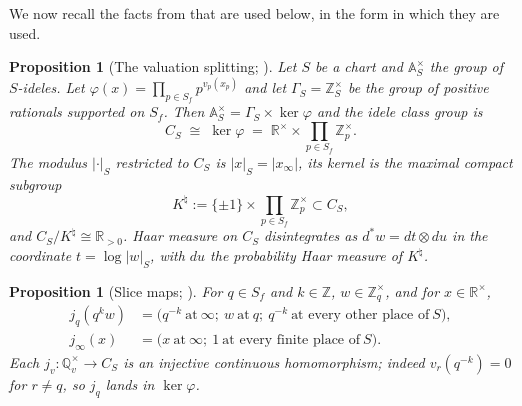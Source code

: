 \documentclass[11pt]{amsart}
\newtheorem{proposition}[theorem]{Proposition}
\theoremstyle{definition}
\theoremstyle{remark}
\newcommand{\R}{\mathbb R}
\newcommand{\Z}{\mathbb Z}
\newcommand{\Q}{\mathbb Q}
\newcommand{\A}{\mathbb A}
\newcommand{\Knat}{K^{\natural}}
\begin{document}
We now recall the facts from \cite{Companion} that are used below, in the
form in which they are used.

\begin{proposition}[The valuation splitting; {\cite[Lemma 2.2]{Companion}}]
\label{prop:splitting}
Let $S$ be a chart and $\A_S^\times$ the group of $S$-ideles. Let
$\varphi(x)=\prod_{p\in S_f}p^{v_p(x_p)}$ and let
$\Gamma_S=\Z_S^\times$ be the group of positive rationals supported on $S_f$.
Then $\A_S^\times=\Gamma_S\times\ker\varphi$ and the idele class group is
\[
  C_S\;\cong\;\ker\varphi\;=\;\R^\times\times\prod_{p\in S_f}\Z_p^\times .
\]
The modulus $|\cdot|_S$ restricted to $C_S$ is $|x|_S=|x_\infty|$, its kernel
is the maximal compact subgroup
\begin{equation}\label{eq:Knat}
   \Knat:=\{\pm1\}\times\prod_{p\in S_f}\Z_p^\times\subset C_S ,
\end{equation}
and $C_S/\Knat\cong\R_{>0}$. Haar measure on $C_S$ disintegrates as
$d^*w=dt\otimes du$ in the coordinate $t=\log|w|_S$, with $du$ the probability
Haar measure of $\Knat$.
\end{proposition}

\begin{proposition}[Slice maps; {\cite[\S6, (32)]{Companion}}]\label{prop:slices}
For $q\in S_f$ and $k\in\Z$, $w\in\Z_q^\times$, and for $x\in\R^\times$,
\begin{align*}
  j_q(q^kw)&=\bigl(q^{-k}\ \text{at}\ \infty;\ w\ \text{at}\ q;\
     q^{-k}\ \text{at every other place of}\ S\bigr),\\
  j_\infty(x)&=\bigl(x\ \text{at}\ \infty;\ 1\ \text{at every finite place of}\
     S\bigr).
\end{align*}
Each $j_v:\Q_v^\times\to C_S$ is an injective continuous homomorphism; indeed
$v_r(q^{-k})=0$ for $r\ne q$, so $j_q$ lands in $\ker\varphi$.
\end{proposition}
\end{document}
